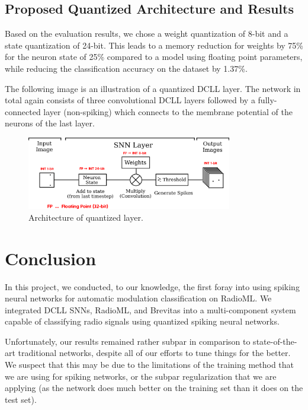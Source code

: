 \documentclass[parskip=true, 10pt]{scrartcl}
\begin{document}
\subsection{Proposed Quantized Architecture and Results}

Based on the evaluation results, we chose a weight quantization of 8-bit and a state quantization of 24-bit. This leads to a memory reduction for weights by 75\% for the neuron state of 25\% compared to a model using floating point parameters, while reducing the classification accuracy on the dataset by 1.37\%.

The following image is an illustration of a quantized DCLL layer. The network in total again consists of three convolutional DCLL layers followed by a fully-connected layer (non-spiking) which connects to the membrane potential of the neurons of the last layer.

\begin{figure}[H]
    \centering
    \includegraphics[width=0.8\textwidth]{quantization.png}
    \caption{Architecture of quantized layer.}
\end{figure}


\section{Conclusion}

In this project, we conducted, to our knowledge, the first foray into using spiking neural networks for automatic modulation classification on RadioML. We integrated DCLL SNNs, RadioML, and Brevitas into a multi-component system capable of classifying radio signals using quantized spiking neural networks.

Unfortunately, our results remained rather subpar in comparison to state-of-the-art traditional networks, despite all of our efforts to tune things for the better. We suspect that this may be due to the limitations of the training method that we are using for spiking networks, or the subpar regularization that we are applying (as the network does much better on the training set than it does on the test set).
\end{document}
